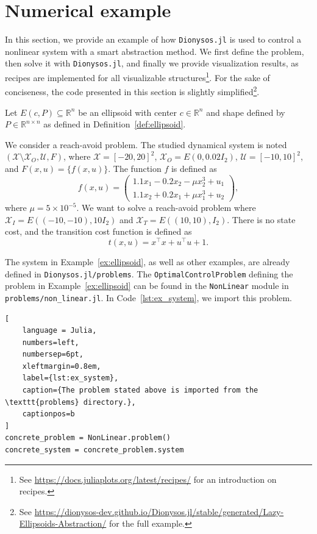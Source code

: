 \documentclass{juliacon}
\begin{document}
\section{Numerical example}
\label{sec:examples}

In this section, we provide an example of how \texttt{Dionysos.jl} is used to control a nonlinear system with a smart abstraction method. We first define the problem, then solve it with \texttt{Dionysos.jl}, and finally we provide visualization results, as recipes are implemented for all visualizable structures\footnote{See \url{https://docs.juliaplots.org/latest/recipes/} for an introduction on recipes.}. For the sake of conciseness, the code presented in this section is slightly simplified\footnote{See \url{https://dionysos-dev.github.io/Dionysos.jl/stable/generated/Lazy-Ellipsoids-Abstraction/} for the full example.}. 

\vskip 6pt

\begin{exam}\label{ex:ellipsoid}
Let $E(c, P) \subseteq \mathbb{R}^n$ be an ellipsoid with center $c \in \mathbb{R}^n$ and shape defined by $P \in \mathbb{R}^{n \times n}$ as defined in Definition~\ref{def:ellipsoid}.

We consider a reach-avoid problem. The studied dynamical system is noted $(\mathcal{X} \setminus \mathcal{X}_O, \mathcal{U}, F)$, where $\mathcal{X} = [-20, 20]^2$, $\mathcal{X}_O = E(0, 0.02I_2)$, $\mathcal{U} = [-10, 10]^2$, and $F(x, u) = \{f(x, u)\}$. The function $f$ is defined as 
\begin{equation}
    f(x, u) = \begin{pmatrix}
        1.1x_1 - 0.2x_2 - \mu x_2^3 + u_1 \\
        1.1x_2 + 0.2x_1 + \mu x_1^3 + u_2
    \end{pmatrix}, 
\end{equation}
where $\mu = 5 \times 10^{-5}$. We want to solve a reach-avoid problem where $\mathcal{X}_I = E((-10, -10), 10I_2)$ and $\mathcal{X}_T = E((10, 10), I_2)$. There is no state cost, and the transition cost function is defined as 
\begin{equation}
    t(x, u) = x^\top x + u^\top u + 1.
\end{equation}
\end{exam}

\vskip 6pt

The system in Example~\ref{ex:ellipsoid}, as well as other examples, are already defined in \texttt{Dionysos.jl/problems}. The \texttt{OptimalControlProblem} defining the problem in Example~\ref{ex:ellipsoid} can be found in the \texttt{NonLinear} module in \texttt{problems/non\_linear.jl}. In Code~\ref{lst:ex_system}, we import this problem.
\begin{lstlisting}[
    language = Julia, 
    numbers=left, 
    numbersep=6pt,
    xleftmargin=0.8em,
    label={lst:ex_system}, 
    caption={The problem stated above is imported from the \texttt{problems} directory.},
    captionpos=b
]
concrete_problem = NonLinear.problem()
concrete_system = concrete_problem.system
\end{lstlisting}
\end{document}
